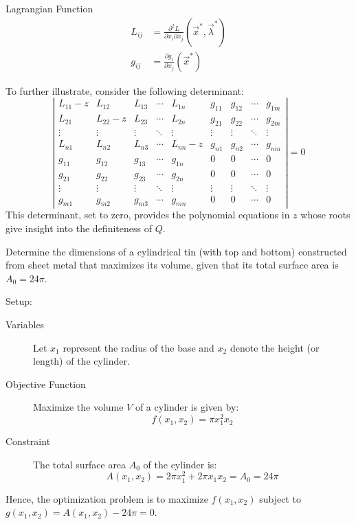 \documentclass[
    NAME={Dr. Helga Ingimundardóttir},
    EMAIL={helgaingim@hi.is},
    FACULTY={Industrial Engineering},
    TITLE={Nonlinear Optimization},
    SUBTITLE={Approaches and Challenges},
    SEMINAR={VÉL113F},
    DATE={Design and Optimization}
]{../HI-latex/hi-beamer}
\begin{document}
\begin{frame}{Lagrangian Function}
        \begin{align*}
            L_{ij} &= \frac{\partial^2 L}{\partial x_i\partial x_j}(\vec{x}^*,\vec{\lambda}^*) \\
            g_{ij} &= \frac{\partial g_i}{\partial x_j}(\vec{x}^*)
        \end{align*}

        To further illustrate, consider the following determinant:
        \[ \left|\begin{matrix}
                     L_{11}-z & L_{12}   & L_{13} & \cdots & L_{1n}   & g_{11} & g_{12} & \cdots & g_{1m} \\
                     L_{21}   & L_{22}-z & L_{23} & \cdots & L_{2n}   & g_{21} & g_{22} & \cdots & g_{2m} \\
                     \vdots   & \vdots   & \vdots & \ddots & \vdots   & \vdots & \vdots & \ddots & \vdots \\
                     L_{n1}   & L_{n2}   & L_{n3} & \cdots & L_{nn}-z & g_{n1} & g_{n2} & \cdots & g_{nm} \\
                     g_{11}   & g_{12}   & g_{13} & \cdots & g_{1n}   & 0      & 0      & \cdots & 0      \\
                     g_{21}   & g_{22}   & g_{23} & \cdots & g_{2n}   & 0      & 0      & \cdots & 0      \\
                     \vdots   & \vdots   & \vdots & \ddots & \vdots   & \vdots & \vdots & \ddots & \vdots \\
                     g_{m1}   & g_{m2}   & g_{m3} & \cdots & g_{mn}   & 0      & 0      & \cdots & 0
        \end{matrix}\right|=0
        \]
        This determinant, set to zero, provides the polynomial equations in $z$ whose roots give insight into the
        definiteness of $Q$.

        \framebreak

        \begin{example}
            Determine the dimensions of a cylindrical tin (with top and bottom) constructed from sheet metal that
            maximizes its volume, given that its total surface area is \(A_0 = 24\pi\).
        \end{example}

        \alert{Setup}:
        \begin{description}
            \item[Variables]
            Let \(x_1\) represent the radius of the base and \(x_2\) denote the height (or length) of the cylinder.
            \item[Objective Function] Maximize the volume \(V\) of a cylinder is given by:
            \[ f(x_1, x_2) = \pi x_1^2 x_2 \]
            \item[Constraint] The total surface area $A_0$ of the cylinder is:
            \[ A(x_1, x_2) = 2\pi x_1^2 + 2\pi x_1 x_2 = A_0 = 24\pi\]
        \end{description}
        Hence, the optimization problem is to maximize $f(x_1, x_2)$ subject to $g(x_1, x_2) = A(x_1,x_2)- 24\pi = 0$.



\end{frame}
\end{document}
